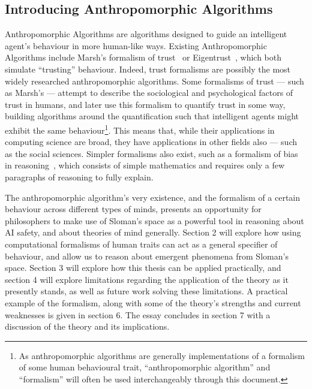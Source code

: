 \subsection{Introducing Anthropomorphic Algorithms}
Anthropomorphic Algorithms are algorithms designed to guide an intelligent agent's behaviour in more human-like ways. Existing Anthropomorphic Algorithms include Marsh's formalism of trust~\citep{Marsh1994FormalisingConcept} or Eigentrust~\citep{eigentrust}, which both simulate ``trusting'' behaviour. Indeed, trust formalisms are possibly the most widely researched anthropomorphic algorithms. Some formalisms of trust --- such as Marsh's --- attempt to describe the sociological and psychological factors of trust in humans, and later use this formalism to quantify trust in some way, building algorithms around the quantification such that intelligent agents might exhibit the same behaviour\footnote{As anthropomorphic algorithms are generally implementations of a formalism of some human behavioural trait, ``anthropomorphic algorithm'' and ``formalism'' will often be used interchangeably through this document.}. This means that, while their applications in computing science are broad, they have applications in other fields also --- such as the social sciences. Simpler formalisms also exist, such as a formalism of bias in reasoning~\cite{armstrong_bias}, which consists of simple mathematics and requires only a few paragraphs of reasoning to fully explain.\par

The anthropomorphic algorithm's very existence, and the formalism of a certain behaviour across different types of minds, presents an opportunity for philosophers to make use of Sloman's space as a powerful tool in reasoning about AI safety, and about theories of mind generally. Section 2 will explore how using computational formalisms of human traits can act as a general specifier of behaviour, and allow us to reason about emergent phenomena from Sloman's space. Section 3 will explore how this thesis can be applied practically, and section 4 will explore limitations regarding the application of the theory as it presently stands, as well as future work solving these limitations. A practical example of the formalism, along with some of the theory's strengths and current weaknesses is given in section 6. The essay concludes in section 7 with a discussion of the theory and its implications.\par
